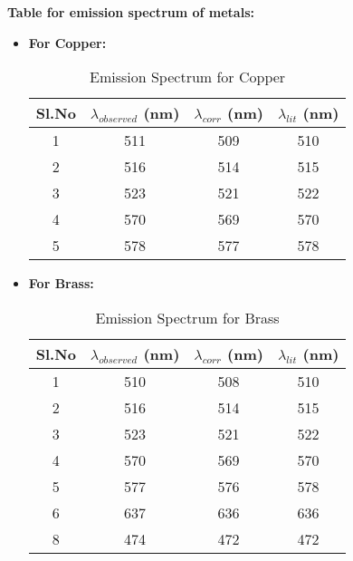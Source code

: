 	\textbf{Table for emission spectrum of metals:}
	\begin{itemize}
		\vspace{-5mm}
		\item \textbf{For Copper:}
		\vspace{-5mm}
		\begin{table}[H]
			\centering
			\begin{tabular}{|c|c|c|c|}
			\hline
			\textbf{Sl.No} & \textbf{$\lambda_{observed}$   (nm)} & \textbf{$\lambda_{corr}$   (nm)} & \textbf{$\lambda_{lit}$   (nm)} \\ \hline
			1 & 511 & 509 & 510 \\ \hline
			2 & 516 & 514 & 515 \\ \hline
			3 & 523 & 521 & 522 \\ \hline
			4 & 570 & 569 & 570 \\ \hline
			5 & 578 & 577 & 578 \\ \hline
			\end{tabular}
			\caption{Emission Spectrum for Copper}
			\label{tab:copper}
		\end{table}
		
		\vspace{-1.5cm}
		\item \textbf{For Brass:}
		\vspace{-5mm}
		\begin{table}[H]
			\centering
			\begin{tabular}{|c|c|c|c|}
			\hline
			\textbf{Sl.No} & \textbf{$\lambda_{observed}$   (nm)} & \textbf{$\lambda_{corr}$   (nm)} & \textbf{$\lambda_{lit}$   (nm)} \\ \hline
			1 & 510 & 508 & 510 \\ \hline
			2 & 516 & 514 & 515 \\ \hline
			3 & 523 & 521 & 522 \\ \hline
			4 & 570 & 569 & 570 \\ \hline
			5 & 577 & 576 & 578 \\ \hline
			6 & 637 & 636 & 636 \\ \hline
			8 & 474 & 472 & 472 \\ \hline
			\end{tabular}
			\caption{Emission Spectrum for Brass}
			\label{tab:brass}
			\end{table}
	\end{itemize}

